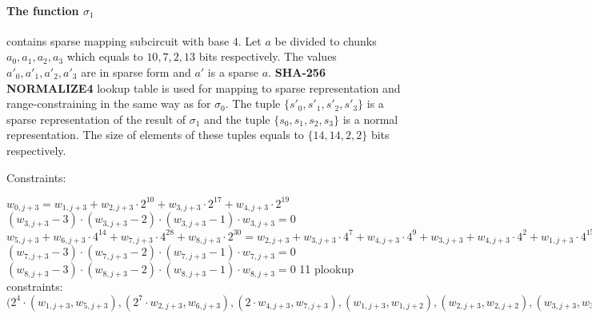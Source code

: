 \paragraph{The function $\sigma_1$} contains sparse mapping subcircuit with base $4$.
Let $a$ be divided to chunks $a_0, a_1, a_2, a_3$ which equals to $10, 7, 2, 13$ bits respectively.
The values $a'_0, a'_1, a'_2, a'_3$ are in sparse form and $a'$ is a sparse $a$.
\textbf{SHA-256 NORMALIZE4} lookup table is used for mapping to sparse representation and range-constraining in the same way as for $\sigma_0$.
The tuple $\{ s'_0, s'_1, s'_2, s'_3\}$ is a sparse representation of the result of $\sigma_1$ and the tuple $\{ s_0, s_1, s_2, s_3\}$  is a normal representation.
The size of elements of these tuples equals to $\{14, 14, 2, 2\}$ bits respectively.

Constraints:
\begin{center}
    $w_{0, j + 3} = w_{1, j + 3} + w_{2, j + 3} \cdot 2^{10} + w_{3,j + 3} \cdot 2^{17} + w_{4, j + 3} \cdot 2^{19}$ \\
    $(w_{3,j + 3} - 3) \cdot (w_{3,j + 3} - 2) \cdot (w_{3,j + 3} - 1) \cdot w_{3,j + 3} = 0$ \\
    $w_{5, j + 3} + w_{6, j + 3} \cdot 4^{14} + w_{7, j + 3} \cdot 4^{28} + w_{8, j + 3} \cdot 2^{30} = w_{2, j + 3} + w_{3, j + 3} \cdot 4^{7} + w_{4, j + 3} \cdot 4^{9} + w_{3, j + 3} + w_{4, j + 3} \cdot 4^{2} + w_{1, j + 3} \cdot 4^{15} + w_{2, j + 3} \cdot 4^{25} + w_{4, j + 3} + w_{1, j + 3} \cdot 4^{13}+ w_{2, j + 3} \cdot 4^{23} + w_{3, j + 3} \cdot 4^{30}$ \\
    $(w_{7, j + 3} - 3) \cdot (w_{7, j + 3} - 2) \cdot (w_{7, j + 3} - 1) \cdot w_{7, j + 3} = 0$
    $(w_{8, j + 3} - 3) \cdot (w_{8, j + 3} - 2) \cdot (w_{8, j + 3} - 1) \cdot w_{8, j + 3} = 0$
    11 plookup constraints: $(2^4 \cdot (w_{1, j + 3}, w_{5, j + 3}), (2^7 \cdot w_{2, j + 3}, w_{6,j+3}), (2 \cdot w_{4, j+3}, w_{7, j + 3}), (w_{1,j + 3}, w_{1,j+2}), (w_{2, j + 3}, w_{2, j + 2}), (w_{3,j + 3}, w_{3,j+2}), (w_{4, j + 3}, w_{4, j+2}), (w_{5, j + 2}, w_{5, j + 3}), (w_{6, j + 2}, w_{6, j + 3}), (w_{7, j + 2}, w_{7, j + 3}), (w_{7, j + 2}, w_{8, j + 3})$ \\
\end{center}

